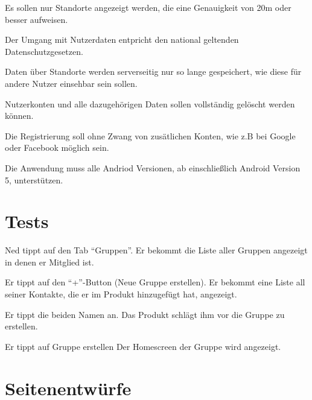 \documentclass[parskip=full,11pt]{scrartcl}
\begin{document}
Es sollen nur Standorte angezeigt werden, die eine Genauigkeit von 20m oder besser aufweisen.

Der Umgang mit Nutzerdaten entpricht den national geltenden Datenschutzgesetzen.

Daten über Standorte werden serverseitig nur so lange gespeichert, wie diese für andere Nutzer einsehbar sein sollen.

Nutzerkonten und alle dazugehörigen Daten sollen vollständig gelöscht werden können.

Die Registrierung soll ohne Zwang von zusätlichen Konten, wie z.B bei Google oder Facebook möglich sein.

Die Anwendung muss alle Andriod Versionen, ab einschließlich Android Version 5, unterstützen.



\section{Tests}


{Ned tippt auf den Tab  \enquote{Gruppen}.}
{Er bekommt die Liste aller Gruppen angezeigt in denen er Mitglied ist.}

{Er tippt auf den \enquote{+}-Button (Neue Gruppe erstellen).}
{Er bekommt eine Liste all seiner Kontakte, die er im Produkt hinzugefügt hat, angezeigt.}

{Er tippt die beiden Namen an.}
{Das Produkt schlägt ihm vor die Gruppe zu erstellen.}

{Er tippt auf Gruppe erstellen}
{Der Homescreen der Gruppe wird angezeigt.} %

\pagebreak
\appendix

\section{Seitenentwürfe}
\end{document}
